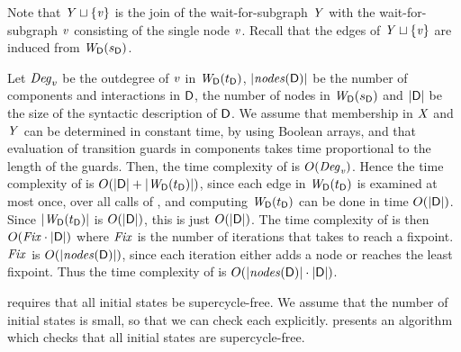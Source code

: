 Note that $\YS \join \set{\ndv}$ is the join of the wait-for-subgraph $\YS$ with the 
wait-for-subgraph $\ndv$ consisting of the single node $\ndv$. Recall
that the edges of $\YS \join \set{\ndv}$ are induced from $\lwfg{B}{\sD}{\DS}$.


Let 
$\Adj_v$ be the outdegree of $\ndv$ in $\lwfg{\B}{\tD}{\DS}$,
$\cnodes{\DS}$ be the number of components and interactions in $\DS$, \ie the number of nodes in $\lwfg{\B}{\sD}{\DS}$ and
$\card{\DS}$ be the size of the syntactic description of $\DS$.
%
We assume that membership in $\XS$ and $\YS$ can be determined in constant time, \eg by using Boolean arrays, and that evaluation of 
transition guards in components takes time proportional to the length of the guards.
%
Then, the time complexity of \cLBL{$\ndv, \dsk{\act}{\l}, \sD, \XS$} is $O(\Adj_\ndv)$.
%
Hence the time complexity of \cVL{$\DS, \sD, \XS$} is 
$O(\card{\DS} + \card{\lwfg{\B}{\tD}{\DS}})$, since each edge in
$\lwfg{\B}{\tD}{\DS}$ is examined at most once, over all calls of
\cLBL{$\ndv, \dsk{\act}{\l}, \sD, \XS$},
and computing $\lwfg{\B}{\tD}{\DS}$ can be done in time $O(\card{\DS})$.
Since $\card{\lwfg{\B}{\tD}{\DS}}$ is $O(\card{\DS})$, this is just $O(\card{\DS})$.
%
The time complexity of \cLFP{$\DS, \sD$} is then $O(\Fix \mult \card{\DS})$
where $\Fix$ is the number of iterations that  \cLFP{$\DS, \sD$} takes to reach a fixpoint.
$\Fix$ is $O(\cnodes{\DS})$, since each iteration either adds a node or reaches the least fixpoint.
Thus the time complexity of  \cLFP{$\DS, \sD$} is $O(\cnodes{\DS} \mult \card{\DS})$.
%





 requires that all initial states be supercycle-free. 
We assume that the number of initial states is small, so that we can check each explicitly. 
  presents an algorithm which checks that all
initial states are supercycle-free.

   \label{s:initSCFree}
%   


